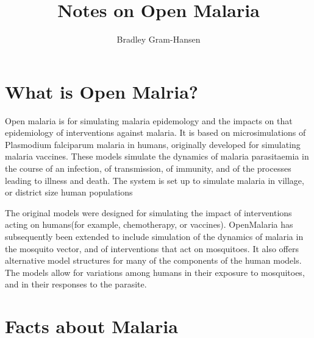 \documentclass[]{scrartcl}
\title{Notes on Open Malaria}
\author{Bradley Gram-Hansen}
\begin{document}
\maketitle

\begin{abstract}

\end{abstract}

% 

\section{What is Open Malria?}
Open malaria is for simulating malaria epidemology and the impacts on that epidemiology of interventions against malaria. 
 It is based on microsimulations of Plasmodium falciparum malaria in humans, originally developed for simulating malaria vaccines.
 These models simulate the dynamics of malaria parasitaemia in the course of an infection, of transmission, of immunity, and of the processes leading to illness and death. The system is set up to simulate malaria in village, or district size human populations

The original models were designed for simulating the impact of interventions acting on humans(for example, chemotherapy, or vaccines). OpenMalaria has subsequently been extended to include simulation of the dynamics of malaria in the mosquito vector, and of interventions that act on mosquitoes. It also offers alternative model structures for many of the components of the human models. The models allow for variations among humans in their exposure to mosquitoes, and in their responses to the parasite.

\section{Facts about Malaria}
\end{document}
